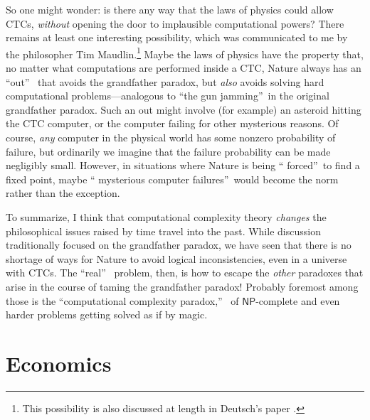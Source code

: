 \documentclass[12pt,onecolumn]{article}%
\begin{document}
So one might wonder: is there any way that the laws of physics could allow
CTCs, \textit{without} opening the door to implausible computational powers?
 There remains at least one interesting possibility, which was communicated
to me by the philosopher Tim Maudlin.\footnote{This possibility is also
discussed at length in Deutsch's paper \cite{deutsch:ctc}.} Maybe the laws
of physics have the property that, no matter what computations are performed
inside a CTC, Nature always has an \textquotedblleft out\textquotedblright\ %
 that avoids the grandfather paradox, but \textit{also} avoids solving hard
computational problems---analogous to \textquotedblleft the gun
jamming\textquotedblright\  in the original grandfather paradox. Such an
out might involve (for example) an asteroid hitting the CTC computer, or the
computer failing for other mysterious reasons. Of course, \textit{any}
computer in the physical world has some nonzero probability of failure, but
ordinarily we imagine that the failure probability can be made negligibly
small. However, in situations where Nature is being \textquotedblleft
forced\textquotedblright\  to find a fixed point, maybe \textquotedblleft
mysterious computer failures\textquotedblright\  would become the norm rather
than the exception.

To summarize, I think that computational complexity theory \textit{changes}
the philosophical issues raised by time travel into the past. While
discussion traditionally focused on the grandfather paradox, we have seen that
there is no shortage of ways for Nature to avoid logical inconsistencies, even
in a universe with CTCs. The \textquotedblleft real\textquotedblright\ %
 problem, then, is how to escape the \textit{other} paradoxes that arise in
the course of taming the grandfather paradox! Probably foremost among those
is the \textquotedblleft computational complexity paradox,\textquotedblright\ %
 of $\mathsf{NP}$-complete and even harder problems getting solved as if by magic.

\section{Economics\label{ECON}}
\end{document}

